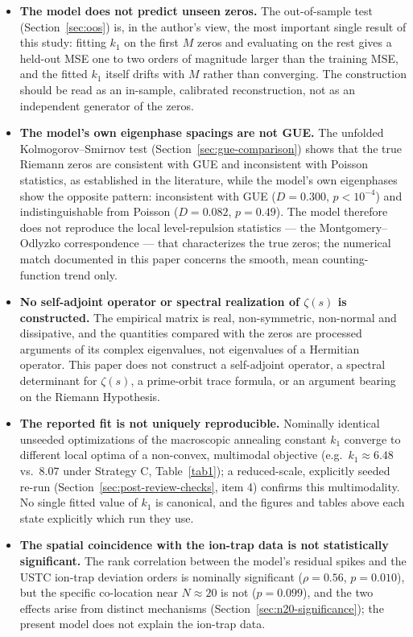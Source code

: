 \documentclass[mca,article,submit,oneauthor,pdftex]{Definitions/mdpi}
\begin{document}
\begin{itemize}
\item \textbf{The model does not predict unseen zeros.} The out-of-sample
  test (Section~\ref{sec:oos}) is, in the author's view, the most important
  single result of this study: fitting $k_1$ on the first $M$ zeros and
  evaluating on the rest gives a held-out MSE one to two orders of magnitude
  larger than the training MSE, and the fitted $k_1$ itself drifts with $M$
  rather than converging. The construction should be read as an in-sample,
  calibrated reconstruction, not as an independent generator of the zeros.
\item \textbf{The model's own eigenphase spacings are not GUE.} The unfolded
  Kolmogorov--Smirnov test (Section~\ref{sec:gue-comparison}) shows that the
  true Riemann zeros are consistent with GUE and inconsistent with Poisson
  statistics, as established in the literature, while the model's own
  eigenphases show the opposite pattern: inconsistent with GUE
  ($D=0.300$, $p<10^{-4}$) and indistinguishable from Poisson ($D=0.082$,
  $p=0.49$). The model therefore does not reproduce the local level-repulsion
  statistics --- the Montgomery--Odlyzko correspondence --- that
  characterizes the true zeros; the numerical match documented in this paper
  concerns the smooth, mean counting-function trend only.
\item \textbf{No self-adjoint operator or spectral realization of $\zeta(s)$
  is constructed.} The empirical matrix is real, non-symmetric, non-normal
  and dissipative, and the quantities compared with the zeros are processed
  arguments of its complex eigenvalues, not eigenvalues of a Hermitian
  operator. This paper does not construct a self-adjoint operator, a spectral
  determinant for $\zeta(s)$, a prime-orbit trace formula, or an argument
  bearing on the Riemann Hypothesis.
\item \textbf{The reported fit is not uniquely reproducible.} Nominally
  identical unseeded optimizations of the macroscopic annealing constant
  $k_1$ converge to different local optima of a non-convex, multimodal
  objective (e.g.\ $k_1\approx6.48$ vs.\ $8.07$ under Strategy C,
  Table~\ref{tab1}); a reduced-scale, explicitly seeded re-run
  (Section~\ref{sec:post-review-checks}, item 4) confirms this multimodality.
  No single fitted value of $k_1$ is canonical, and the figures and tables
  above each state explicitly which run they use.
\item \textbf{The spatial coincidence with the ion-trap data is not
  statistically significant.} The rank correlation between the model's
  residual spikes and the USTC ion-trap deviation orders is nominally
  significant ($\rho=0.56$, $p=0.010$), but the specific co-location near
  $N\approx20$ is not ($p=0.099$), and the two effects arise from distinct
  mechanisms (Section~\ref{sec:n20-significance}); the present model does not
  explain the ion-trap data.
\end{itemize}
\end{document}
